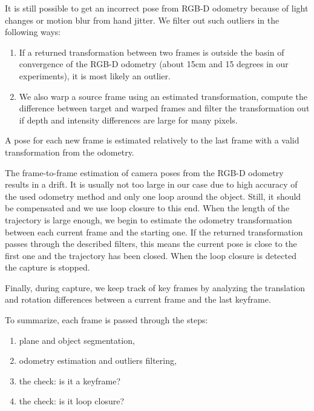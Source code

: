 \documentclass[letterpaper, 10 pt, conference]{ieeeconf}  %
\begin{document}
It is still possible to get an incorrect pose from RGB-D odometry
because of light changes or motion blur from hand jitter. We filter out such outliers in the following ways:

\begin{enumerate}
 \item If a returned transformation between two frames is outside the basin of convergence
 of the RGB-D odometry (about 15cm and 15 degrees in our experiments), it is most likely an outlier.
 \item We also warp a source frame using an estimated transformation,
 compute the difference between target and warped frames 
 and filter the transformation out if
 depth and intensity differences are large for many pixels.
\end{enumerate}

A pose for each new frame is estimated relatively to the last frame
with a valid transformation from the odometry.

The frame-to-frame estimation of camera poses from the RGB-D 
odometry results in a drift. It is usually not too large in our case
due to high accuracy of the used odometry method \cite{steinbrucker2011real}
and only one loop around the object.
Still, it should be compensated and we use loop closure to this end.
When the length of the trajectory is large enough, we begin to estimate the
odometry transformation between each current frame and the starting one. 
If the returned transformation passes through the described filters, 
this means the current pose is close to the first one and 
the trajectory has been closed. When the loop closure is detected 
the capture is stopped.

Finally, during capture, we keep track of key frames by analyzing the translation and rotation differences between a 
current frame and the last keyframe.

To summarize, each frame is passed through the steps:

\begin{enumerate}
 \item plane and object segmentation,
 \item odometry estimation and outliers filtering,
 \item the check: is it a keyframe?
 \item the check: is it loop closure?
\end{enumerate}
\end{document}
